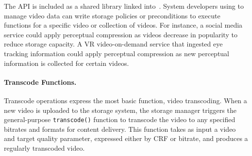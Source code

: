 \begin{table*}[h]
\centering
{}

\caption{\name API \label{table:policies}}

\end{table*}

The \name API is included as a shared library linked into~\lightdb.
System developers using \nameStore to manage video data can write storage policies or preconditions to execute \nameStore functions for a specific video or collection of videos.
For instance, a social media service could apply perceptual compression as videos decrease in popularity to reduce storage capacity.
A VR video-on-demand service that ingested eye tracking information could apply perceptual compression as new perceptual information is collected for certain videos.

\paragraph{Transcode Functions.}
Transcode operations express the most basic \nameStore function, video transcoding.
When a new video is uploaded to the storage system, the storage manager triggers the general-purpose \texttt{transcode()} function to transcode the video to any specified bitrates and formats for content delivery.
This function takes as input a video and target quality parameter, expressed either by CRF or bitrate, and produces a regularly transcoded video.

